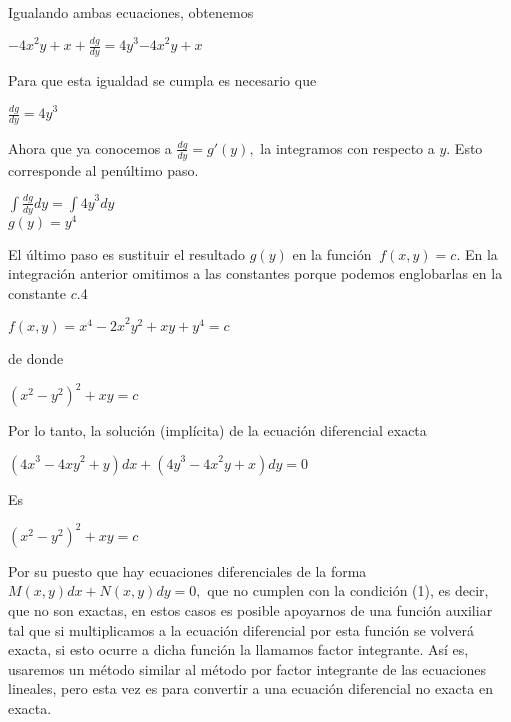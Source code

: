 \documentclass[l etterpaper,11pt]{article}
\begin{document}
Igualando ambas ecuaciones, obtenemos
\begin{center}

${-4x}^2y+x+\frac{dg}{dy}={4y}^3{-4x}^2y+x$\\
\end{center}

Para que esta igualdad se cumpla es necesario que
\begin{center}

$\frac{dg}{dy}={4y}^3$\\
\end{center}

Ahora que ya conocemos a $  \frac{dg}{dy}=g\prime(y), $ la integramos con respecto a $y$. Esto corresponde al penúltimo paso.
\begin{center}

$\int\frac{dg}{dy}dy=\int{4y}^3dy$\\
$g(y)=y^4$\\
\end{center}

El último paso es sustituir el resultado $ g(y) $ en la función $\ f(x,y)=c.$  En la integración anterior omitimos a las constantes porque podemos englobarlas en la constante $c.$4
\begin{center}

$f(x,y)=x^4-{2x}^2y^2+xy+y^4=c$\\
\end{center}

de donde
\begin{center}

${(x^2-y^2)}^2+xy=c$\\
\end{center}

Por lo tanto, la solución (implícita) de la ecuación diferencial exacta
\begin{center}

$({4x}^3-{4xy}^2+y)dx+({4y}^3-{4x}^2y+x)dy=0$\\
\end{center}

Es
\begin{center}

${(x^2-y^2)}^2+xy=c$\\
\end{center}


Por su puesto que hay ecuaciones diferenciales de la forma $ M(x,y)dx+N(x,y)dy=0 ,$ que no cumplen con la condición (1), es decir, que no son exactas, en estos casos es posible apoyarnos de una función auxiliar tal que si multiplicamos a la ecuación diferencial por esta función se volverá exacta, si esto ocurre a dicha función la llamamos factor integrante. Así es, usaremos un método similar al método por factor integrante de las ecuaciones lineales, pero esta vez es para convertir a una ecuación diferencial no exacta en exacta.
\end{document}
